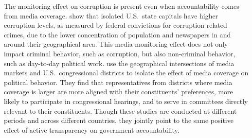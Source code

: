 \documentclass[11pt]{article}
\begin{document}
The monitoring effect on corruption is present even when accountability comes from media coverage. \citet{CampanteIsolatedCapitalCities2014} show that isolated U.S.~state capitals have higher corruption levels, as measured by federal convictions for corruption-related crimes, due to the lower concentration of population and newspapers in and around their geographical area. This media monitoring effect does not only impact criminal behavior, such as corruption, but also non-criminal behavior, such as day-to-day political work. \citet{SnyderJrPressCoveragePolitical2010} use the geographical intersections of media markets and U.S.~congressional districts to isolate the effect of media coverage on political behavior. They find that representatives from districts where media coverage is larger are more aligned with their constituents' preferences, more likely to participate in congressional hearings, and to serve in committees directly relevant to their constituents. Though these studies  are conducted at different periods and across different countries, they jointly point to the same positive effect of active transparency on government accountability.
\end{document}

